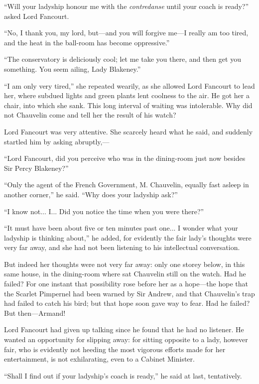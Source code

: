 \documentclass[paper=a5,BCOR=7mm,twoside,DIV=calc,12pt,usegeometry,chapterprefix,endperiod,headings=big]{scrbook}
\begin{document}
\enquote{Will your ladyship honour me with the \textit{contredanse} until your coach is ready?} asked Lord Fancourt.

\enquote{No, I thank you, my lord, but---and you will forgive me---I really am too tired, and the heat in the ball-room has become oppressive.}

\enquote{The conservatory is deliciously cool; let me take you there, and then get you something. You seem ailing, Lady Blakeney.}

\enquote{I am only very tired,} she repeated wearily, as she allowed Lord Fancourt to lead her, where subdued lights and green plants lent coolness to the air. He got her a chair, into which she sank. This long interval of waiting was intolerable. Why did not Chauvelin come and tell her the result of his watch?

Lord Fancourt was very attentive. She scarcely heard what he said, and suddenly startled him by asking abruptly,---

\enquote{Lord Fancourt, did you perceive who was in the dining-room just now besides Sir Percy Blakeney?}

\enquote{Only the agent of the French Government, M. Chauvelin, equally fast asleep in another corner,} he said. \enquote{Why does your ladyship ask?}

\enquote{I know not... I... Did you notice the time when you were there?}

\enquote{It must have been about five or ten minutes past one... I wonder what your ladyship is thinking about,} he added, for evidently the fair lady's thoughts were very far away, and she had not been listening to his intellectual conversation.

But indeed her thoughts were not very far away: only one storey below, in this same house, in the dining-room where sat Chauvelin still on the watch. Had he failed? For one instant that possibility rose before her as a hope---the hope that the Scarlet Pimpernel had been warned by Sir Andrew, and that Chauvelin's trap had failed to catch his bird; but that hope soon gave way to fear. Had he failed? But then---Armand!

Lord Fancourt had given up talking since he found that he had no listener. He wanted an opportunity for slipping away: for sitting opposite to a lady, however fair, who is evidently not heeding the most vigorous efforts made for her entertainment, is not exhilarating, even to a Cabinet Minister.

\enquote{Shall I find out if your ladyship's coach is ready,} he said at last, tentatively.
\end{document}
